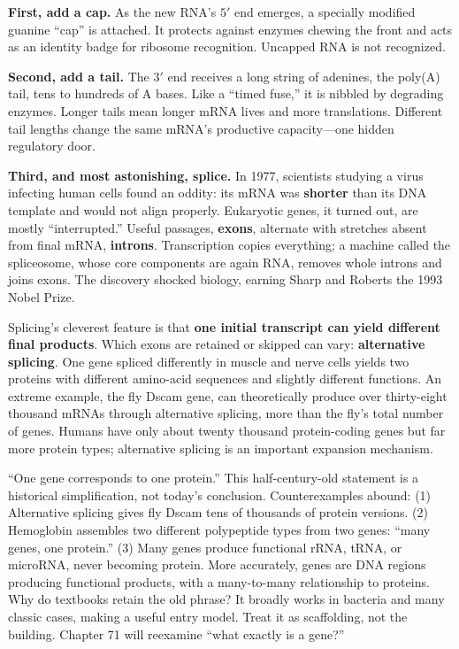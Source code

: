 \textbf{First, add a cap.} As the new RNA's $5'$ end emerges, a specially modified guanine ``cap'' is attached. It protects against enzymes chewing the front and acts as an identity badge for ribosome recognition. Uncapped RNA is not recognized.

\textbf{Second, add a tail.} The $3'$ end receives a long string of adenines, the poly(A) tail, tens to hundreds of A bases. Like a ``timed fuse,'' it is nibbled by degrading enzymes. Longer tails mean longer mRNA lives and more translations. Different tail lengths change the same mRNA's productive capacity---one hidden regulatory door.

\textbf{Third, and most astonishing, splice.} In 1977, scientists studying a virus infecting human cells found an oddity: its mRNA was \textbf{shorter} than its DNA template and would not align properly. Eukaryotic genes, it turned out, are mostly ``interrupted.'' Useful passages, \textbf{exons}, alternate with stretches absent from final mRNA, \textbf{introns}. Transcription copies everything; a machine called the spliceosome, whose core components are again RNA, removes whole introns and joins exons. The discovery shocked biology, earning Sharp and Roberts the 1993 Nobel Prize.

Splicing's cleverest feature is that \textbf{one initial transcript can yield different final products}. Which exons are retained or skipped can vary: \textbf{alternative splicing}. One gene spliced differently in muscle and nerve cells yields two proteins with different amino-acid sequences and slightly different functions. An extreme example, the fly Dscam gene, can theoretically produce over thirty-eight thousand mRNAs through alternative splicing, more than the fly's total number of genes. Humans have only about twenty thousand protein-coding genes but far more protein types; alternative splicing is an important expansion mechanism.

\begin{wuqu}
``One gene corresponds to one protein.'' This half-century-old statement is a historical simplification, not today's conclusion. Counterexamples abound: (1) Alternative splicing gives fly Dscam tens of thousands of protein versions. (2) Hemoglobin assembles two different polypeptide types from two genes: ``many genes, one protein.'' (3) Many genes produce functional rRNA, tRNA, or microRNA, never becoming protein. More accurately, genes are DNA regions producing functional products, with a many-to-many relationship to proteins. Why do textbooks retain the old phrase? It broadly works in bacteria and many classic cases, making a useful entry model. Treat it as scaffolding, not the building. Chapter 71 will reexamine ``what exactly is a gene?''
\end{wuqu}

